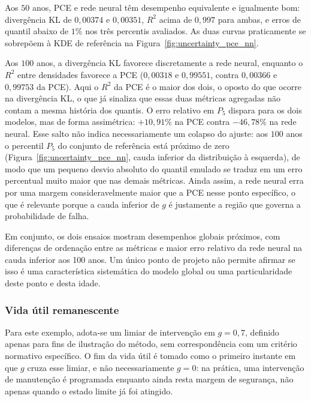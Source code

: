 Aos $50$ anos, PCE e rede neural têm desempenho equivalente e igualmente bom: divergência KL de $0{,}00374$ e $0{,}00351$, $R^2$ acima de $0{,}997$ para ambas, e erros de quantil abaixo de $1\%$ nos três percentis avaliados. As duas curvas praticamente se sobrepõem à KDE de referência na Figura~\ref{fig:uncertainty_pce_nn}.

Aos $100$ anos, a divergência KL favorece discretamente a rede neural, enquanto o $R^2$ entre densidades favorece a PCE ($0{,}00318$ e $0{,}99551$, contra $0{,}00366$ e $0{,}99753$ da PCE). Aqui o $R^2$ da PCE é o maior dos dois, o oposto do que ocorre na divergência KL, o que já sinaliza que essas duas métricas agregadas não contam a mesma história dos quantis. O erro relativo em $P_5$ dispara para os dois modelos, mas de forma assimétrica: $+10{,}91\%$ na PCE contra $-46{,}78\%$ na rede neural. Esse salto não indica necessariamente um colapso do ajuste: aos $100$ anos o percentil $P_5$ do conjunto de referência está próximo de zero (Figura~\ref{fig:uncertainty_pce_nn}, cauda inferior da distribuição à esquerda), de modo que um pequeno desvio absoluto do quantil emulado se traduz em um erro percentual muito maior que nas demais métricas. Ainda assim, a rede neural erra por uma margem consideravelmente maior que a PCE nesse ponto específico, o que é relevante porque a cauda inferior de $g$ é justamente a região que governa a probabilidade de falha.

Em conjunto, os dois ensaios mostram desempenhos globais próximos, com diferenças de ordenação entre as métricas e maior erro relativo da rede neural na cauda inferior aos 100 anos. Um único ponto de projeto não permite afirmar se isso é uma característica sistemática do modelo global ou uma particularidade deste ponto e desta idade. 

\subsubsection{Vida útil remanescente}

Para este exemplo, adota-se um limiar de intervenção em $g=0{,}7$, definido apenas para fins de ilustração do método, sem correspondência com um critério normativo específico. O fim da vida útil é tomado como o primeiro instante em que $g$ cruza esse limiar, e não necessariamente $g=0$: na prática, uma intervenção de manutenção é programada enquanto ainda resta margem de segurança, não apenas quando o estado limite já foi atingido.

